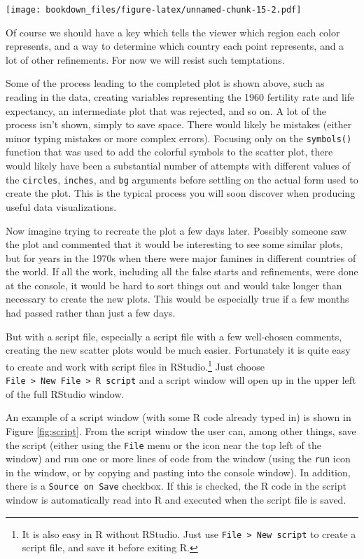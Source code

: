 \documentclass[
]{krantz}
\begin{document}
\texttt{[image: bookdown\_files/figure-latex/unnamed-chunk-15-2.pdf]}

Of course we should have a key which tells the viewer which region each color represents, and a way to determine which country each point represents, and a lot of other refinements. For now we will resist such temptations.

Some of the process leading to the completed plot is shown above, such as reading in the data, creating variables representing the 1960 fertility rate and life expectancy, an intermediate plot that was rejected, and so on. A lot of the process isn't shown, simply to save space. There would likely be mistakes (either minor typing mistakes or more complex errors). Focusing only on the \texttt{symbols()} function that was used to add the colorful symbols to the scatter plot, there would likely have been a substantial number of attempts with different values of the \texttt{circles}, \texttt{inches}, and \texttt{bg} arguments before settling on the actual form used to create the plot. This is the typical process you will soon discover when producing useful data visualizations.

Now imagine trying to recreate the plot a few days later. Possibly someone saw the plot and commented that it would be interesting to see some similar plots, but for years in the 1970s when there were major famines in different countries of the world. If all the work, including all the false starts and refinements, were done at the console, it would be hard to sort things out and would take longer than necessary to create the new plots. This would be especially true if a few months had passed rather than just a few days.

But with a script file, especially a script file with a few well-chosen comments, creating the new scatter plots would be much easier. Fortunately it is quite easy to create and work with script files in RStudio.\footnote{It is also easy in R without RStudio. Just use \texttt{File\ \textgreater{}\ New\ script} to create a script file, and save it before exiting R.} Just choose \texttt{File\ \textgreater{}\ New\ File\ \textgreater{}\ R\ script} and a script window will open up in the upper left of the full RStudio window.

An example of a script window (with some R code already typed in) is shown in Figure \ref{fig:script}. From the script window the user can, among other things, save the script (either using the \texttt{File} menu or the icon near the top left of the window) and run one or more lines of code from the window (using the \texttt{run} icon in the window, or by copying and pasting into the console window). In addition, there is a \texttt{Source\ on\ Save} checkbox. If this is checked, the R code in the script window is automatically read into R and executed when the script file is saved.
\end{document}
